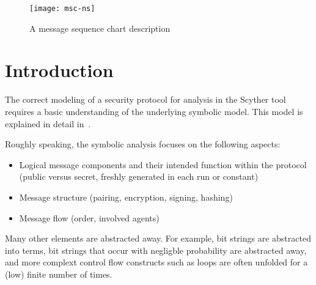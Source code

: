 \documentclass{book}
\begin{document}
\begin{figure}[!htb]
	\centering
  \texttt{[image: msc-ns]}
  \caption{A message sequence chart description}
  \label{msc:ns3}
\end{figure}

\section{Introduction}

The correct modeling of a security protocol for analysis in the Scyther
tool requires a basic understanding of the underlying 
symbolic model. This model is explained in detail in~\cite{opsembook}.

Roughly speaking, the symbolic analysis focuses on the following
aspects:
\begin{itemize}

	\item Logical message components and their intended function within the
		protocol (public versus
		secret, freshly generated in each run or constant)
	\item Message structure (pairing, encryption, signing, hashing)
	\item Message flow (order, involved agents)

\end{itemize}
Many other elements are abstracted away. For example, bit strings are
abstracted into terms, bit strings that occur with negligble probability
are abstracted away, and more complext control flow constructs such as
loops are often unfolded for a (low) finite number of times.

%

\end{document}
